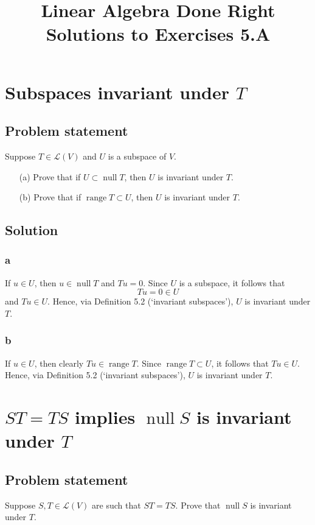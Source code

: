 \documentclass{article}
\title{Linear Algebra Done Right\\Solutions to Exercises 5.A}
\author{}
\date{}
\begin{document}
\maketitle

\section{Subspaces invariant under $T$}
\subsection*{Problem statement}
Suppose $T\in\mathcal{L}(V)$ and $U$ is a subspace of $V$.
\begin{enumerate}
    \item[(a)] Prove that if $U\subset\operatorname{null}T$, then $U$ is invariant under $T$.
    \item[(b)] Prove that if $\operatorname{range}T\subset U$, then $U$ is invariant under $T$.
\end{enumerate}

\subsection*{Solution}
\subsubsection*{a}
If $u\in U$, then $u\in\operatorname{null}T$ and $Tu=0$. 
Since $U$ is a subspace, it follows that
\[Tu=0\in U\]
and $Tu\in U$. 
Hence, via Definition 5.2 (`invariant subspaces'), $U$ is invariant under $T$.

\subsubsection*{b}
If $u\in U$, then clearly $Tu\in\operatorname{range}T$. 
Since $\operatorname{range}T\subset U$, it follows that $Tu\in U$. 
Hence, via Definition 5.2 (`invariant subspaces'), $U$ is invariant under $T$.

\clearpage

\section{$ST=TS$ implies $\operatorname{null}S$ is invariant under $T$}
\subsection*{Problem statement}
Suppose $S,T\in\mathcal{L}(V)$ are such that $ST=TS$. 
Prove that $\operatorname{null}S$ is invariant under $T$.
\end{document}
